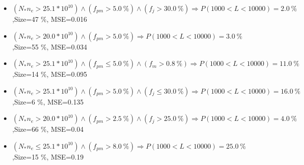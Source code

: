 \documentclass[numbered]{CSL}
\begin{document}
\begin{itemize}
\item $(N_* n_e > 25.1 * 10^{10}) \land (f_{pm} > 5.0~\%) \land (f_j > 30.0~\%) \Rightarrow P(1 000 < L < 10 000) = 2.0~\%$,\hfill Size=47 \%, MSE=0.016
\item $(N_* n_e > 20.0 * 10^{10}) \land (f_{pm} > 5.0~\%) \Rightarrow P(1 000 < L < 10 000) = 3.0~\%$,\hfill Size=55 \%, MSE=0.034
\item $(N_* n_e > 25.1 * 10^{10}) \land (f_{pm} \leq 5.0~\%) \land (f_m > 0.8~\%) \Rightarrow P(1 000 < L < 10 000) = 11.0~\%$,\hfill Size=14 \%, MSE=0.095
\item $(N_* n_e > 25.1 * 10^{10}) \land (f_{pm} > 5.0~\%) \land (f_j \leq 30.0~\%) \Rightarrow P(1 000 < L < 10 000) = 16.0~\%$,\hfill Size=6 \%, MSE=0.135
\item $(N_* n_e > 20.0 * 10^{10}) \land (f_{pm} > 2.5~\%) \land (f_j > 25.0~\%) \Rightarrow P(1 000 < L < 10 000) = 4.0~\%$,\hfill Size=66 \%, MSE=0.04
\item $(N_* n_e \leq 25.1 * 10^{10}) \land (f_{pm} > 8.0~\%) \Rightarrow P(1 000 < L < 10 000) = 25.0~\%$,\hfill Size=15 \%, MSE=0.19
\end{itemize}
\end{document}

